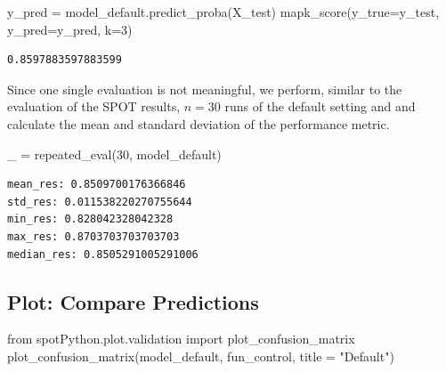 \documentclass[
  letterpaper,
  DIV=11,
  numbers=noendperiod]{scrreprt}
\newenvironment{Shaded}{\begin{snugshade}}{\end{snugshade}}
\newcommand{\DecValTok}[1]{\textcolor[rgb]{0.68,0.00,0.00}{#1}}
\newcommand{\ImportTok}[1]{\textcolor[rgb]{0.00,0.46,0.62}{#1}}
\newcommand{\NormalTok}[1]{\textcolor[rgb]{0.00,0.23,0.31}{#1}}
\newcommand{\OperatorTok}[1]{\textcolor[rgb]{0.37,0.37,0.37}{#1}}
\newcommand{\StringTok}[1]{\textcolor[rgb]{0.13,0.47,0.30}{#1}}
\begin{document}
\begin{Shaded}
\begin{Highlighting}[]
\NormalTok{y\_pred }\OperatorTok{=}\NormalTok{ model\_default.predict\_proba(X\_test)}
\NormalTok{mapk\_score(y\_true}\OperatorTok{=}\NormalTok{y\_test, y\_pred}\OperatorTok{=}\NormalTok{y\_pred, k}\OperatorTok{=}\DecValTok{3}\NormalTok{)}
\end{Highlighting}
\end{Shaded}

\begin{verbatim}
0.8597883597883599
\end{verbatim}

Since one single evaluation is not meaningful, we perform, similar to
the evaluation of the SPOT results, \(n=30\) runs of the default setting
and and calculate the mean and standard deviation of the performance
metric.

\begin{Shaded}
\begin{Highlighting}[]
\NormalTok{\_ }\OperatorTok{=}\NormalTok{ repeated\_eval(}\DecValTok{30}\NormalTok{, model\_default)}
\end{Highlighting}
\end{Shaded}

\begin{verbatim}
mean_res: 0.8509700176366846
std_res: 0.011538220270755644
min_res: 0.828042328042328
max_res: 0.8703703703703703
median_res: 0.8505291005291006
\end{verbatim}

\hypertarget{plot-compare-predictions-1}{%
\subsection{Plot: Compare
Predictions}\label{plot-compare-predictions-1}}

\begin{Shaded}
\begin{Highlighting}[]
\ImportTok{from}\NormalTok{ spotPython.plot.validation }\ImportTok{import}\NormalTok{ plot\_confusion\_matrix}
\NormalTok{plot\_confusion\_matrix(model\_default, fun\_control, title }\OperatorTok{=} \StringTok{"Default"}\NormalTok{)}
\end{Highlighting}
\end{Shaded}
\end{document}
